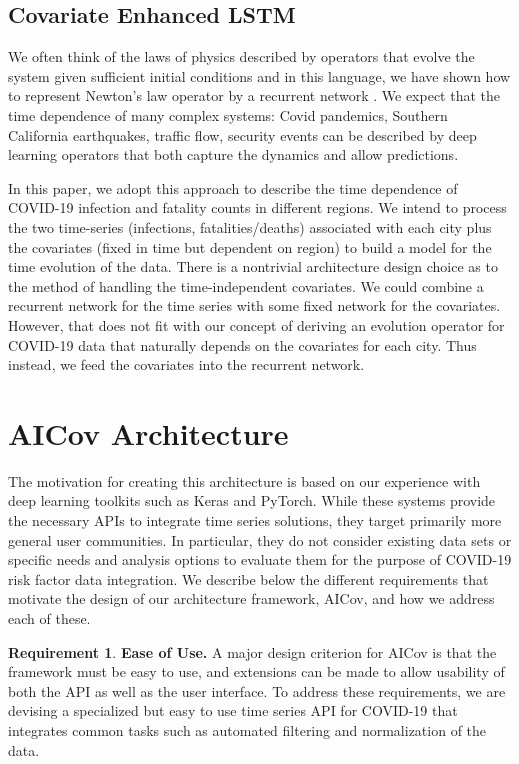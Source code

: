 \documentclass[12pt]{article}
\theoremstyle{definition}
\newtheorem{requirement}{Requirement}
\renewcommand{\_}{%
    \textunderscore\hspace{0pt}%
}
\begin{document}
\subsection{Covariate Enhanced LSTM}

We often think of the laws of physics described by operators that
evolve the system given sufficient initial conditions and in this
language, we have shown how to represent Newton’s law operator by a
recurrent network \cite{Kadupitiya2020-zq}. We expect that the time
dependence of many complex systems: Covid pandemics, Southern
California earthquakes, traffic flow, security events can be described
by deep learning operators that both capture the dynamics and allow
predictions. 

In this paper, we adopt this approach to describe the
time dependence of COVID-19 infection and fatality counts in different
regions. 
We intend to
process the two time-series (infections, fatalities/deaths) associated with
each city plus the covariates (fixed in time but dependent on region)
to build a model for the time evolution of the data. There is a
nontrivial architecture design choice as to the method of handling the
time-independent covariates. We could combine a recurrent network for
the time series with some fixed network for the covariates. However,
that does not fit with our concept of deriving an evolution operator
for COVID-19 data that naturally depends on the covariates for each
city. Thus instead, we feed the covariates into the recurrent network.

\section{AICov Architecture}
\label{sec:arch}

The motivation for creating this architecture is based on our experience with deep learning toolkits such as Keras and PyTorch. While these systems provide the necessary APIs to integrate time series solutions, they target primarily more general user communities. In particular, they do not consider existing data sets or specific needs and analysis options to evaluate them for the purpose of COVID-19 risk factor data integration. We describe below the different requirements that motivate the design of our architecture framework, AICov, and how we address each of these.

\newcommand{\Solution}{}

\begin{requirement}{\bf Ease of Use.} A major design criterion for AICov is that the framework must be easy to use, and extensions can be made to allow usability of both the API as well as the user interface. \Solution To address these requirements, we are devising a specialized but easy to use time series API for COVID-19 that integrates common tasks such as automated filtering and normalization of the data.
\end{requirement}
\end{document}
